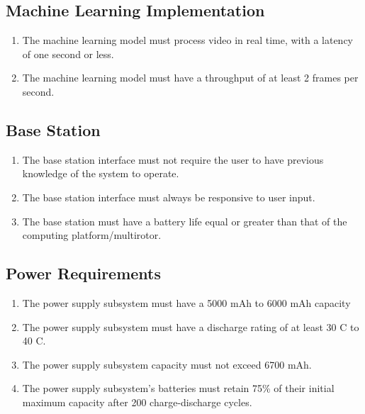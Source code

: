 \documentclass[10pt,letterpaper]{article}
\begin{document}
\subsection{Machine Learning Implementation}
\begin{enumerate}[label=NF.ML.\arabic*, wide=1cm, widest=3cm, leftmargin=*, font=\bfseries, noitemsep,topsep=0pt, parsep=4pt, partopsep=0pt]
	\item The machine learning model must process video in real time, with a latency of one second or less.
	\item The machine learning model must have a throughput of at least 2 frames per second.
\end{enumerate}

\subsection{Base Station}
\begin{enumerate}[label=NF.BS.\arabic*, wide=1cm, widest=3cm, leftmargin=*, font=\bfseries, noitemsep,topsep=0pt, parsep=4pt, partopsep=0pt]
	\item The base station interface must not require the user to have previous knowledge of the system to operate.
	\item The base station interface must always be responsive to user input.
	\item The base station must have a battery life equal or greater than that of the computing platform/multirotor.
\end{enumerate}

\subsection{Power Requirements}
\begin{enumerate}[label=NF.PR.\arabic*, wide=1cm, widest=3cm, leftmargin=*, font=\bfseries, noitemsep,topsep=0pt, parsep=4pt, partopsep=0pt]
	\item The power supply subsystem must have a 5000 mAh to 6000 mAh capacity 
	\item The power supply subsystem must have a discharge rating of at least 30 C to 40 C.
	\item The power supply subsystem capacity must not exceed 6700 mAh.
	\item The power supply subsystem's batteries must retain 75\% of their initial maximum capacity after 200 charge-discharge cycles.
\end{enumerate}
\end{document}
